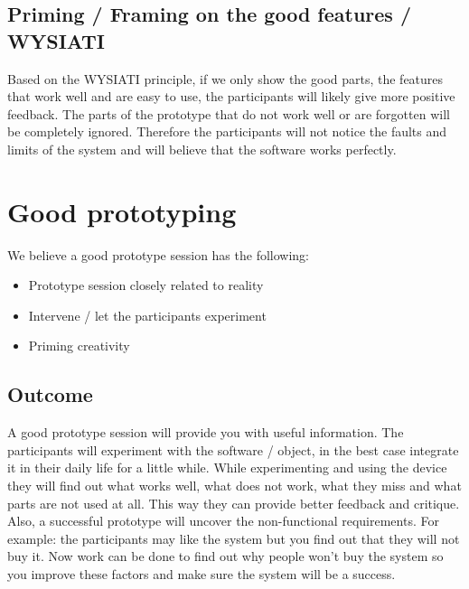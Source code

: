 \documentclass{article}
\begin{document}
\subsection{Priming / Framing on the good features / WYSIATI}
Based on the WYSIATI principle, if we only show the good parts, the features that work well and are easy to use, the participants will likely give more positive feedback. The parts of
the prototype that do not work well or are forgotten will be completely ignored.
Therefore the participants will not notice the faults and limits of the system
and will believe that the software works perfectly.


\section{Good prototyping}
We believe a good prototype session has the following:

\begin{itemize}
\item Prototype session closely related to reality
\item Intervene / let the participants experiment
\item Priming creativity 
\end{itemize}
 
\subsection{Outcome}
A good prototype session will provide you with useful information. The participants
will experiment with the software / object, in the best case integrate it in their
daily life for a little while. While experimenting and using the device they will
find out what works well, what does not work, what they miss and what parts
are not used at all. This way they can provide better feedback and critique.
Also, a successful prototype will uncover the non-functional requirements.
For example: the participants may like the system but you find out that they will not
buy it. Now work can be done to find out why people won't buy the system so you improve these factors and  make sure the system will be a success.


%
%
\end{document}
